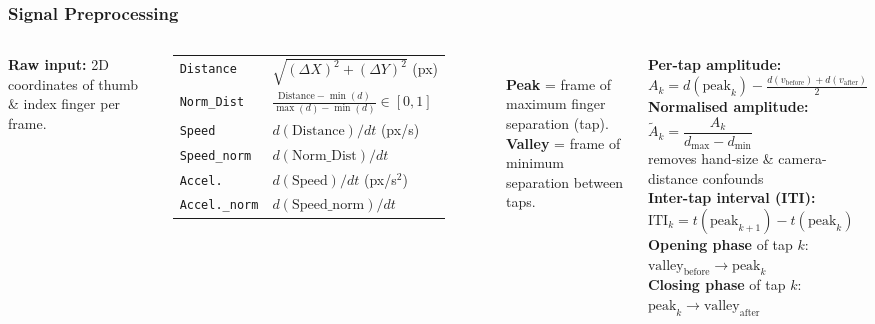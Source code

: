\documentclass[aspectratio=169]{beamer}
\begin{document}
\begin{frame}
    \frametitle{Signal Preprocessing}
    \scriptsize
    \begin{columns}[T]
        \textbf{Raw input:} 2D coordinates of thumb \& index finger per frame.\\[0.4em]
        \begin{tabular}{p{2.2cm}p{4.6cm}}
            \texttt{Distance} & $\sqrt{(\Delta X)^2+(\Delta Y)^2}$ (px) \\[0.3em]
            \texttt{Norm\_Dist} & $\frac{\text{Distance}-\min(d)}{\max(d)-\min(d)} \in [0,1]$ \\[0.3em]
            \texttt{Speed}    & $d(\text{Distance})/dt$ \quad (px/s) \\[0.3em]
            \texttt{Speed\_norm}    & $d(\text{Norm\_Dist})/dt$ \\[0.3em]
            \texttt{Accel.}   & $d(\text{Speed})/dt$ \quad (px/s$^2$) \\[0.3em]
            \texttt{Accel.\_norm}   & $d(\text{Speed\_norm})/dt$ \\
        \end{tabular}\\[0.5em]
        \textbf{Peak} = frame of maximum finger separation (tap).\\
        \textbf{Valley} = frame of minimum separation between taps.

        \textbf{Per-tap amplitude:}\\
        $A_k = d(\text{peak}_k) - \tfrac{d(v_\text{before})+d(v_\text{after})}{2}$\\[0.3em]
        \textbf{Normalised amplitude:}\\
        $\tilde{A}_k = \dfrac{A_k}{d_\text{max} - d_\text{min}}$\\[0.1em]
        {\scriptsize removes hand-size \& camera-distance confounds}\\[0.4em]
        \textbf{Inter-tap interval (ITI):}\\
        $\text{ITI}_k = t(\text{peak}_{k+1}) - t(\text{peak}_k)$\\[0.4em]
        \textbf{Opening phase} of tap $k$: $\text{valley}_\text{before} \to \text{peak}_k$\\
        \textbf{Closing phase} of tap $k$: $\text{peak}_k \to \text{valley}_\text{after}$
    \end{columns}
\end{frame}
\end{document}
